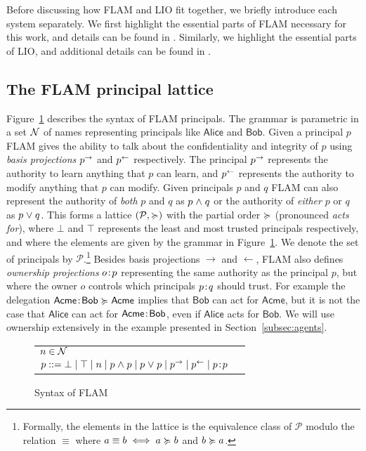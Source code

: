 Before discussing how FLAM and LIO fit together, we briefly introduce each system separately. We first highlight the essential parts of FLAM necessary for this work, and details can be found in \cite{Arden:2015:FA:2859845.2859998}. Similarly, we highlight the essential parts of LIO, and additional details can be found in \cite{SRMMlio}.

\subsection{The FLAM principal lattice}
Figure~\ref{fig:flam-syntax} describes the syntax of FLAM principals. The grammar is parametric in a set $\mathcal{N}$ of names representing principals like $\mathsf{Alice}$ and $\mathsf{Bob}$. Given a principal $p$ FLAM gives the ability to talk about the confidentiality and integrity of $p$ using \emph{basis projections} $p^{\rightarrow}$ and $p^{\leftarrow}$ respectively. The principal $p^{\rightarrow}$ represents the authority to learn anything that $p$ can learn, and $p^{\leftarrow}$ represents the authority to modify anything that $p$ can modify. Given principals $p$ and $q$ FLAM can also represent the authority of \emph{both} $p$ and $q$ as $p \mathrel{\land} q$ or the authority of \emph{either} $p$ or $q$ as $p \mathrel{\lor} q$. This forms a lattice $(\mathcal{P}, \succcurlyeq)$ with the partial order $\succcurlyeq$ (pronounced \emph{acts for}), where $\bot$ and $\top$ represents the least and most trusted principals respectively, and where the elements are given by the grammar in Figure~\ref{fig:flam-syntax}. We denote the set of principals by $\mathcal{P}$.\footnote{Formally, the elements in the lattice is the equivalence class of $\mathcal{P}$ modulo the relation $\equiv$ where $a \equiv b \iff a \succcurlyeq b$ and $b \succcurlyeq a$.} Besides basis projections $\rightarrow$ and $\leftarrow$, FLAM also defines \emph{ownership projections} $o\!:\!p$ representing the same authority as the principal $p$, but where the owner $o$ controls which principals $p\!:\!q$ should trust. For example the delegation $\mathsf{Acme}\!:\!\mathsf{Bob} \succcurlyeq \mathsf{Acme}$ implies that $\mathsf{Bob}$ can act for $\mathsf{Acme}$, but it is not the case that $\mathsf{Alice}$ can act for $\mathsf{Acme}\!:\!\mathsf{Bob}$, even if $\mathsf{Alice}$ acts for $\mathsf{Bob}$. We will use ownership extensively in the example presented in Section~\ref{subsec:agents}.

\begin{figure}
    \centering
    \begin{tabular}{ll}
    $n \in \mathcal{N}$ \\
    $p ::= \bot \mid \top \mid n \mid p \mathrel{\land} p \mid p \mathrel{\lor} p \mid p^{\rightarrow} \mid p^{\leftarrow} \mid p\!:\!p$
    \end{tabular}
    \caption{Syntax of FLAM}
    \label{fig:flam-syntax}
\end{figure}


